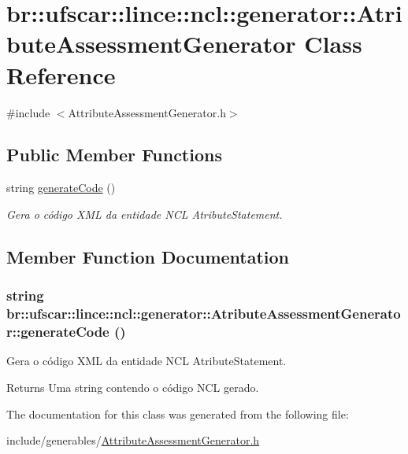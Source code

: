 \hypertarget{classbr_1_1ufscar_1_1lince_1_1ncl_1_1generator_1_1AtributeAssessmentGenerator}{
\section{br::ufscar::lince::ncl::generator::AtributeAssessmentGenerator Class Reference}
\label{classbr_1_1ufscar_1_1lince_1_1ncl_1_1generator_1_1AtributeAssessmentGenerator}
}


{\ttfamily \#include $<$AttributeAssessmentGenerator.h$>$}

\subsection*{Public Member Functions}
\begin{DoxyCompactItemize}
\item 
string \hyperlink{classbr_1_1ufscar_1_1lince_1_1ncl_1_1generator_1_1AtributeAssessmentGenerator_a18daed058ca29c4d25bdff18d351cf34}{generateCode} ()
\begin{DoxyCompactList}\small\item\em Gera o código XML da entidade NCL AtributeStatement. \item\end{DoxyCompactList}\end{DoxyCompactItemize}


\subsection{Member Function Documentation}
\hypertarget{classbr_1_1ufscar_1_1lince_1_1ncl_1_1generator_1_1AtributeAssessmentGenerator_a18daed058ca29c4d25bdff18d351cf34}{
\subsubsection[{generateCode}]{\setlength{\rightskip}{0pt plus 5cm}string br::ufscar::lince::ncl::generator::AtributeAssessmentGenerator::generateCode ()}}
\label{classbr_1_1ufscar_1_1lince_1_1ncl_1_1generator_1_1AtributeAssessmentGenerator_a18daed058ca29c4d25bdff18d351cf34}


Gera o código XML da entidade NCL AtributeStatement. 

\begin{DoxyReturn}{Returns}
Uma string contendo o código NCL gerado. 
\end{DoxyReturn}


The documentation for this class was generated from the following file:\begin{DoxyCompactItemize}
\item 
include/generables/\hyperlink{AttributeAssessmentGenerator_8h}{AttributeAssessmentGenerator.h}\end{DoxyCompactItemize}
